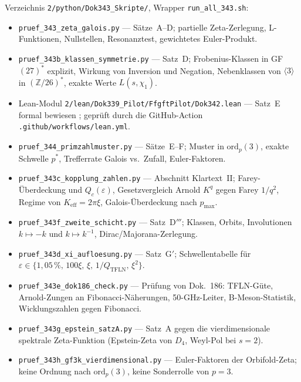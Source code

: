 Verzeichnis \texttt{2/python/Dok343\_Skripte/}, Wrapper \texttt{run\_all\_343.sh}:
\begin{itemize}
  \item \texttt{pruef\_343\_zeta\_galois.py} ---
        Sätze~A--D; partielle Zeta-Zerlegung, L-Funktionen, Nullstellen,
        Resonanztest, gewichtetes Euler-Produkt.
  \item \texttt{pruef\_343b\_klassen\_symmetrie.py} ---
        Satz~D; Frobenius-Klassen in GF$(27)^*$ explizit, Wirkung von Inversion
        und Negation, Nebenklassen von $\langle 3\rangle$ in $(\mathbb{Z}/26)^*$,
        exakte Werte $L(s,\chi_1)$.
  \item Lean-Modul \texttt{2/\allowbreak lean/\allowbreak Dok339\_Pilot/\allowbreak FfgftPilot/\allowbreak Dok342.lean} ---
        Satz~E formal bewiesen \LM; geprüft durch die GitHub-Action
        \texttt{.github/\allowbreak workflows/\allowbreak lean.yml}.
  \item \texttt{pruef\_344\_primzahlmuster.py} ---
        Sätze~E--F; Muster in $\mathrm{ord}_p(3)$, exakte Schwelle $p^*$,
        Trefferrate Galois vs.\ Zufall, Euler-Faktoren.
  \item \texttt{pruef\_343c\_kopplung\_zahlen.py} ---
        Abschnitt Klartext~II; Farey-Überdeckung und $Q_c(\varepsilon)$, Gesetzvergleich
        Arnold $K^q$ gegen Farey $1/q^2$, Regime von $K_\mathrm{eff}=2\pi\xi$,
        Galois-Überdeckung nach $p_\mathrm{max}$.
  \item \texttt{pruef\_343f\_zweite\_schicht.py} --- Satz~D$'''$; Klassen, Orbits,
        Involutionen $k\mapsto-k$ und $k\mapsto k^{-1}$, Dirac/Majorana-Zerlegung.
  \item \texttt{pruef\_343d\_xi\_aufloesung.py} --- Satz~G$'$; Schwellentabelle für
        $\varepsilon\in\{1{,}05\,\%,\,100\xi,\,\xi,\,1/Q_\mathrm{TFLN},\,\xi^2\}$.
  \item \texttt{pruef\_343e\_dok186\_check.py} --- Prüfung von Dok.~186: TFLN-Güte,
        Arnold-Zungen an Fibonacci-Näherungen, 50-GHz-Leiter, B-Meson-Statistik,
        Wicklungszahlen gegen Fibonacci.
  \item \texttt{pruef\_343g\_epstein\_satzA.py} --- Satz~A gegen die vierdimensionale
        spektrale Zeta-Funktion (Epstein-Zeta von $D_4$, Weyl-Pol bei $s=2$).
  \item \texttt{pruef\_343h\_gf3k\_vierdimensional.py} --- Euler-Faktoren der
        Orbifold-Zeta; keine Ordnung nach $\mathrm{ord}_p(3)$, keine Sonderrolle von $p=3$.
\end{itemize}

